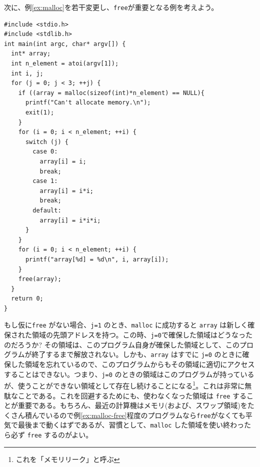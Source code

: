 次に、例\ref{ex:malloc}を若干変更し、\verb|free|が重要となる例を考えよう。
\begin{reidai}\label{ex:malloc-free}
\begin{verbatim}
#include <stdio.h>
#include <stdlib.h>
int main(int argc, char* argv[]) {
  int* array;
  int n_element = atoi(argv[1]);
  int i, j;
  for (j = 0; j < 3; ++j) {
    if ((array = malloc(sizeof(int)*n_element) == NULL){
      printf("Can't allocate memory.\n");
      exit(1);
    }
    for (i = 0; i < n_element; ++i) {
      switch (j) {
        case 0:
          array[i] = i;
          break;
        case 1:
          array[i] = i*i;
          break;
        default:
          array[i] = i*i*i;
      }
    }
    for (i = 0; i < n_element; ++i) {
      printf("array[%d] = %d\n", i, array[i]);
    }
    free(array);
  }
  return 0;
}
\end{verbatim}
\end{reidai} \noindent
もし仮に\verb|free| がない場合、\verb|j=1| のとき、\verb|malloc| に成功すると \verb|array| は新しく確保された領域の先頭アドレスを持つ。この時、\verb|j=0|で確保した領域はどうなったのだろうか? その領域は、このプログラム自身が確保した領域として、このプログラムが終了するまで解放されない。しかも、\verb|array| はすでに \verb|j=0| のときに確保した領域を忘れているので、このプログラムからもその領域に適切にアクセスすることはできない。つまり、\verb|j=0| のときの領域はこのプログラムが持っているが、使うことができない領域として存在し続けることになる\footnote{これを「メモリリーク」と呼ぶ}。これは非常に無駄なことである。これを回避するためにも、使わなくなった領域は \verb|free| することが重要である。もちろん、最近の計算機はメモリ(および、スワップ領域)をたくさん積んでいるので例\ref{ex:malloc-free}程度のプログラムなら\verb|free|がなくても平気で最後まで動くはずであるが、習慣として、\verb|malloc| した領域を使い終わったら必ず \verb|free| するのがよい。
%
%


